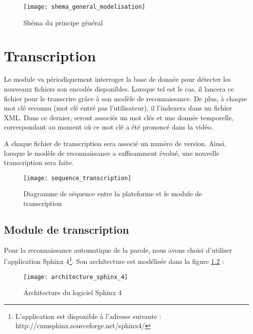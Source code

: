 	\begin{figure}[H]
		\begin{center}
			\texttt{[image: shema\_general\_modelisation]}
			\caption{Shéma du principe général}
			\label{sequence_transcription}
		\end{center}
	\end{figure}

	
	
	
	\chapter{Transcription}
	Le module va périodiquement interroger la base de donnée pour détecter les nouveaux fichiers son encodés disponibles. Lorsque tel est le cas, il lancera ce fichier pour le transcrire grâce à son modèle de reconnaissance. De plus, à chaque mot clé reconnu (mot clé entré pas l'utilisateur), il l'indexera dans un fichier XML. Dans ce dernier, seront associés un mot clés et une donnée temporelle, correspondant au moment où ce mot clé a été prononcé dans la vidéo.

	A chaque fichier de transcription sera associé un numéro de version. Ainsi, lorsque le modèle de reconnaissance a suffisamment évolué, une nouvelle transcription sera faite.
	
	\begin{figure}[H]
		\begin{center}
			\texttt{[image: sequence\_transcription]}
			\caption{Diagramme de séquence entre la plateforme et le module de transcription}
			\label{sequence_transcription}
		\end{center}
	\end{figure}

	
	\section{Module de transcription}
	Pour la reconnaissance automatique de la parole, nous avons choisi d'utiliser l'application Sphinx 4\footnote{L'application est disponible à l'adresse suivante : http://cmusphinx.sourceforge.net/sphinx4/}. Son architecture est modélisée dans la figure \ref{architecture_sphinx_4} :
	
	\begin{figure}[H]
		\begin{center}
			\texttt{[image: architecture\_sphinx\_4]}
			\caption{Architecture du logiciel Sphinx 4}
			\label{architecture_sphinx_4}
		\end{center}
	\end{figure}

